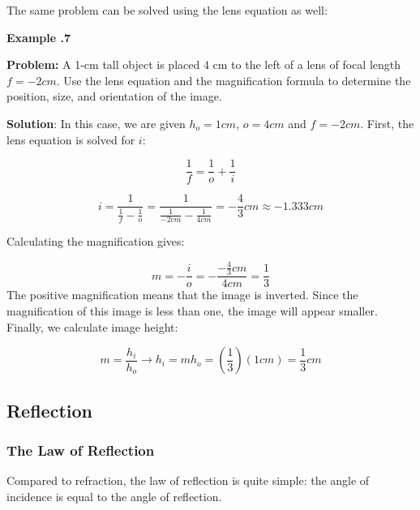 The same problem can be solved using the lens equation as well:

 \begin{mdframed}[backgroundcolor=blue!10!white]
	\begin{center}	
		\textbf{Example \thesection.7}	
	\end{center}
	
	\textbf{Problem:} A 1-cm tall object is placed 4 cm to the left of a lens of focal length $f=-2 \si{cm}$.  Use the lens equation and the magnification formula to determine the position, size, and orientation of the image.  
	
	\textbf{Solution}: In this case, we are given $h_o = 1 \si{cm}$, $o = 4 \si{cm}$ and $f = -2 \si{cm}$.  First, the lens equation is solved for $i$:
	
	\begin{equation*}
	\frac{1}{f} = \frac{1}{o} + \frac{1}{i}  
	\end{equation*}
	
	
	\begin{equation*}
	i = \frac{1}{\frac{1}{f}-\frac{1}{o}} = \frac{1}{\frac{1}{-2\si{cm}}-\frac{1}{4\si{cm}}} = \boxed{-\frac{4}{3} \si{cm} \approx -1.333 \si{cm}}
	\end{equation*}
	
	
	Calculating the magnification gives: 
	
	\begin{equation*}
	m = - \frac{i}{o} = -\frac{-\frac{4}{3}\si{cm}}{4\si{cm}} = \boxed{\frac{1}{3}}
	\end{equation*}
	The positive magnification means that the image is inverted.  Since the magnification of this image is less than one, the image will appear smaller.  Finally, we calculate image height:  
	
	\begin{equation*}
	m = \frac{h_i}{h_o} \longrightarrow h_i = m h_o = (\frac{1}{3}) (1 \si{cm}) = \boxed{\frac{1}{3} \si{cm}}
	\end{equation*}
\end{mdframed}





		

	\subsection{Reflection} 
	
			\subsubsection{The Law of Reflection}   
			Compared to refraction, the law of reflection is quite simple: the angle of incidence is equal to the angle of reflection.  
			
